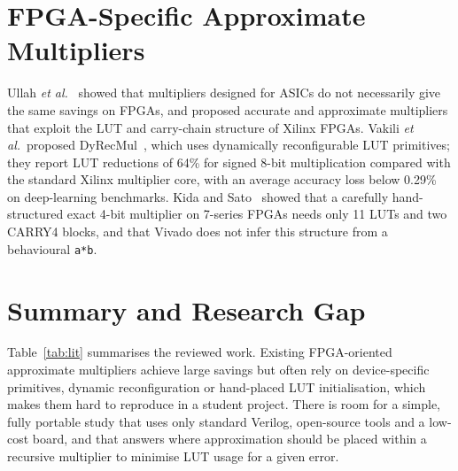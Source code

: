 \documentclass[12pt,a4paper,oneside]{report}
\begin{document}
\section{FPGA-Specific Approximate Multipliers}
Ullah \emph{et al.}~\cite{ullah2022fpga} showed that multipliers designed for ASICs do not necessarily give the same savings on FPGAs, and proposed accurate and approximate multipliers that exploit the LUT and carry-chain structure of Xilinx FPGAs. Vakili \emph{et al.}\ proposed DyRecMul~\cite{vakili2024dyrecmul}, which uses dynamically reconfigurable LUT primitives; they report LUT reductions of 64\% for signed 8-bit multiplication compared with the standard Xilinx multiplier core, with an average accuracy loss below 0.29\% on deep-learning benchmarks. Kida and Sato~\cite{kida2025fourbit} showed that a carefully hand-structured exact 4-bit multiplier on 7-series FPGAs needs only 11 LUTs and two CARRY4 blocks, and that Vivado does not infer this structure from a behavioural \texttt{a*b}.

\section{Summary and Research Gap}
Table~\ref{tab:lit} summarises the reviewed work. Existing FPGA-oriented approximate multipliers achieve large savings but often rely on device-specific primitives, dynamic reconfiguration or hand-placed LUT initialisation, which makes them hard to reproduce in a student project. There is room for a simple, fully portable study that uses only standard Verilog, open-source tools and a low-cost board, and that answers where approximation should be placed within a recursive multiplier to minimise LUT usage for a given error.
\end{document}
